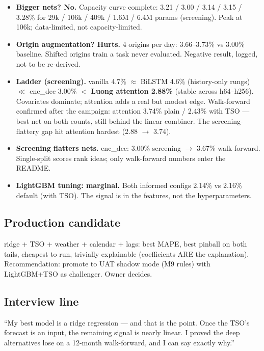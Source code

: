 \begin{itemize}
  \item \textbf{Bigger nets? No.} Capacity curve complete: 3.21 / 3.00 /
        3.14 / 3.15 / 3.28\% for 29k / 106k / 409k / 1.6M / 6.4M params
        (screening). Peak at 106k; data-limited, not capacity-limited.
  \item \textbf{Origin augmentation? Hurts.} 4 origins per day: 3.66--3.73\%
        vs 3.00\% baseline. Shifted origins train a task never evaluated.
        Negative result, logged, not to be re-derived.
  \item \textbf{Ladder (screening).} vanilla 4.7\% $\approx$ BiLSTM 4.6\%
        (history-only rungs) $\ll$ enc\_dec 3.00\% $<$
        \textbf{Luong attention 2.88\%} (stable across h64--h256).
        Covariates dominate; attention adds a real but modest edge.
        Walk-forward confirmed after the campaign: attention 3.74\%
        plain / 2.43\% with TSO --- best net on both counts, still behind
        the linear combiner. The screening-flattery gap hit attention
        hardest (2.88 $\to$ 3.74).
  \item \textbf{Screening flatters nets.} enc\_dec: 3.00\% screening
        $\to$ 3.67\% walk-forward. Single-split scores rank ideas;
        only walk-forward numbers enter the README.
  \item \textbf{LightGBM tuning: marginal.} Both informed configs 2.14\%
        vs 2.16\% default (with TSO). The signal is in the features,
        not the hyperparameters.
\end{itemize}

\subsection{Production candidate}

ridge + TSO + weather + calendar + lags: best MAPE, best pinball on both
tails, cheapest to run, trivially explainable (coefficients ARE the
explanation). Recommendation: promote to UAT shadow mode (M9 rules) with
LightGBM+TSO as challenger. Owner decides.

\subsection{Interview line}

``My best model is a ridge regression --- and that is the point. Once the
TSO's forecast is an input, the remaining signal is nearly linear. I proved
the deep alternatives lose on a 12-month walk-forward, and I can say
exactly why.''
